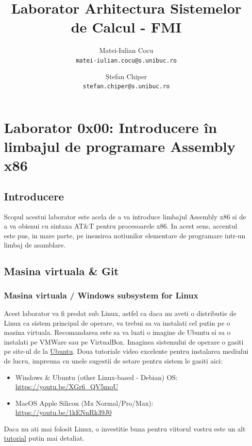 \documentclass[a4paper,10pt]{article}
\title{\huge Laborator Arhitectura Sistemelor de Calcul - FMI}
\author{
  Matei-Iulian Cocu\\
  \texttt{matei-iulian.cocu@s.unibuc.ro}
  \and
  Ștefan Chiper\\
  \texttt{stefan.chiper@s.unibuc.ro}
} \date{}
\begin{document}
\maketitle
\setcounter{tocdepth}{2}
\tableofcontents
\thispagestyle{empty}
\newpage

\section{Laborator 0x00: Introducere în limbajul de programare Assembly x86}
\subsection{Introducere}
Scopul acestui laborator este acela de a va introduce limbajul Assembly x86 si de a va obisnui cu
sintaxa AT\&T pentru procesoarele x86. In acest sens, accentul este pus, in mare parte, pe insusirea
notiunilor elementare de programare intr-un limbaj de asamblare.


\subsection{Masina virtuala \& Git}
\subsubsection{Masina virtuala / Windows subsystem for Linux}
Acest laborator va fi predat sub Linux, astfel ca daca nu aveti o distributie de Linux ca sistem
principal de operare, va trebui sa va instalati cel putin pe o masina virtuala. Recomandarea este sa
va luati o imagine de Ubuntu si sa o instalati pe VMWare sau pe VirtualBox. 
Imaginea sistemului de operare o gasiti pe site-ul de la \href{https://ubuntu.com/download/desktop}{Ubuntu}.
Doua tutoriale video excelente pentru instalarea mediului de lucru, impreuna cu unele sugestii de setare
pentru sistem le gasiti aici: 
\begin{itemize}
    \item Windows \& Ubuntu (other Linux-based - Debian) OS: \url{https://youtu.be/XGr6_QV5moU}
    \item MacOS Apple Silicon (Mx Normal/Pro/Max): \url{https://youtu.be/1kENnRk39J0}
\end{itemize}
Daca nu ati mai folosit Linux, o investitie buna pentru viitorul
vostru este un alt \href{https://www.youtube.com/watch?v=wBp0Rb-ZJak}{tutorial} putin mai detaliat.
\end{document}
